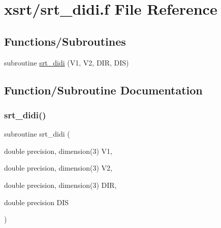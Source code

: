 \hypertarget{srt__didi_8f}{}\section{xsrt/srt\+\_\+didi.f File Reference}
\label{srt__didi_8f}
\subsection*{Functions/\+Subroutines}
\begin{DoxyCompactItemize}
\item 
subroutine \hyperlink{srt__didi_8f_af6c109b0a0fbf1ec3ed4bd6ebe7968e2}{srt\+\_\+didi} (V1, V2, D\+IR, D\+IS)
\end{DoxyCompactItemize}


\subsection{Function/\+Subroutine Documentation}
\mbox{\label{srt__didi_8f_af6c109b0a0fbf1ec3ed4bd6ebe7968e2}} 
\subsubsection{\texorpdfstring{srt\+\_\+didi()}{srt\_didi()}}
{\footnotesize\ttfamily subroutine srt\+\_\+didi (\begin{DoxyParamCaption}\item[{double precision, dimension(3)}]{V1,  }\item[{double precision, dimension(3)}]{V2,  }\item[{double precision, dimension(3)}]{D\+IR,  }\item[{double precision}]{D\+IS }\end{DoxyParamCaption})}


